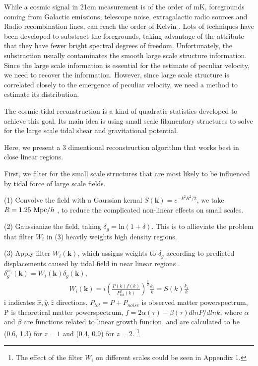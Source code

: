 While a cosmic signal in 21cm measurement is of the order of mK,  
foregrounds coming from Galactic emissions, telescope noise, 
extragalactic radio sources and Radio recombination lines, 
can reach the order of Kelvin \cite{DiMatteo04}\cite{Masui13}. 
Lots of techniques have been developed to substract the foregrounds, 
taking advantage of the attribute that they have fewer bright spectral
degrees of freedom\cite{Switzer15}.
Unfortunately, the substraction usually contaminates the smooth large scale structure information.
Since the large scale information is essential for the estimate of
peculiar velocity, we need to recover the information.
However, since large scale structure is correlated closely to the emergence of peculiar velocity, we need a method to estimate its distribution.

The cosmic tidal reconstruction is a kind of quadratic statistics developed to achieve this goal.
Its main idea is using small scale filamentary structures to solve for the large scale tidal shear and gravitational potential.

Here, we present a 3 dimentional reconstruction algorithm that works best in close linear regions.

First, we filter for the small scale structures that are most likely to be influenced by tidal force of large scale fields.

(1) Convolve the field with a Gaussian kernal
$S(\bm{k})=e^{-k^2R^2/2}$, 
we take $R=1.25\ \mathrm{Mpc}/h$ \cite{2012:pen},
to reduce the complicated non-linear effects on small scales.

(2) Gaussianize the field, taking 
$\delta_g=\mathrm{ln}(1+\delta)$. 
This is to allieviate the problem that filter $W_i$ in (3) heavily weights high density regions.

(3) Apply filter $W_i(\bm{k})$, which assigns weights to $\delta_g$ according to predicted displacements caused by tidal field in near linear regions \cite{2015:zhu}.
${\delta}^{w_i}_g(\bm{k})=W_i(\bm{k})\delta_g(\bm{k})$, 
\begin{eqnarray}
\label{eq:wi}
W_i(\bm{k})=i (\frac{P(k)f(k)}{P_{tot}^2(k)})^{\frac{1}{2}}\frac{k_i}{k}
=S(k)\frac{k_i}{k}
\end{eqnarray}
i indicates $\hat x,\hat y,\hat z$ directions, 
$P_{tot}=P+P_{noise}$ is observed matter powerspectrum, 
P is theoretical matter powerspectrum,
$f=2\alpha(\tau)-\beta(\tau)dlnP/dlnk$, 
where $\alpha$ and $\beta$ are functions related to linear growth funcion, and are calculated to be (0.6, 1.3) for $z=1$ and (0.4, 0.9) for $z=2$.
\footnote{The effect of the filter $W_i$ on different scales could be seen in Appendix 1.}


